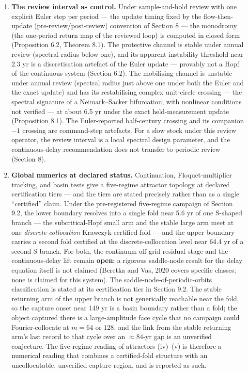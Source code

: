 \documentclass[11pt]{article}
\begin{document}
\begin{enumerate}
  4.4).
\item
  \textbf{The review interval as control.} Under sample-and-hold review
  with one explicit Euler step per period --- the update timing fixed by
  the flow-then-update (pre-review/post-review) convention of Section 8
  --- the monodromy (the one-period return map of the reviewed loop) is
  computed in closed form (Proposition 6.2, Theorem 8.1). The protective
  channel is stable under annual review (spectral radius below one), and
  its apparent instability threshold near 2.3 yr is a discretisation
  artefact of the Euler update --- provably not a Hopf of the continuous
  system (Section 6.2). The mobilising channel is unstable under annual
  review (spectral radius just above one under both the Euler and the
  exact update) and has its restabilising complex unit-circle crossing
  --- the spectral signature of a Neimark--Sacker bifurcation, with
  nonlinear conditions not verified --- at about 6.5 yr under the exact
  held-measurement update (Proposition 8.1). The Euler-reported
  half-century crossing and its companion \(-1\) crossing are
  command-step artefacts. For a slow stock under this review operator,
  the review interval is a local spectral design parameter, and the
  continuous-delay recommendation does not transfer to periodic review
  (Section 8).
\item
  \textbf{Global numerics at declared status.} Continuation,
  Floquet-multiplier tracking, and basin tests give a five-regime
  attractor topology at declared certification tiers --- and the tiers
  are stated precisely rather than as a single ``certified'' claim.
  Under the pre-registered five-regime campaign of Section 9.2, the
  lower boundary resolves into a single fold near 5.6 yr of one S-shaped
  branch --- the subcritical-Hopf small arm and the stable large arm
  meet at one \emph{discrete-collocation} Krawczyk-certified fold ---
  and the upper boundary carries a second fold certified at the
  discrete-collocation level near 64.4 yr of a second S-branch. For
  both, the continuum off-grid residual stage and the continuous-delay
  lift remain \textbf{open}; a rigorous saddle-node result for the delay
  equation itself is not claimed (Beretka and Vas, 2020 covers specific
  classes; none is claimed for this system). The
  saddle-node-of-periodic-orbits classification is stated at its
  certification tier in Section 9.2. The stable returning arm of the
  upper branch is not generically reachable near the fold, so the
  capture onset near 149 yr is a basin boundary rather than a fold; the
  object captured there is a large-amplitude face cycle that no campaign
  could Fourier-collocate at \(m = 64\) or \(128\), and the link from
  the stable returning arm's last record to that cycle over an
  \(\approx 84\)-yr gap is an unverified conjecture. The five-regime
  reading of attractors (iv)--(v) is therefore a numerical reading that
  combines a certified-fold structure with an uncollocatable,
  unverified-capture region, and is reported as such.
\end{enumerate}
\end{document}
